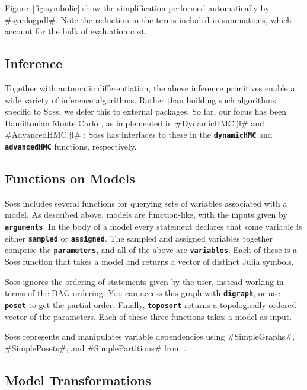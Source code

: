 \documentclass[anonymous=false, %
               format=acmsmall, %
               review=false, %
               screen=true, %
               nonacm=true]{acmart}
\begin{document}
Figure~\ref{fig:symbolic} show the simplification performed automatically by \jl#symlogpdf#. Note the reduction in the terms included in summations, which account for the bulk of evaluation cost. 

\subsection{Inference}

Together with automatic differentiation, the above inference primitives enable a wide variety of inference algorithms. Rather than building such algorithms specific to Soss, we defer this to external packages. So far, our focus has been Hamiltonian Monte Carlo \cite{Neal2011}, as implemented in \jl#DynamicHMC.jl# \cite{tamas_k_papp_2019_3590018} and \jl#AdvancedHMC.jl# \cite{ge2018t}; Soss has interfaces to these in the {\bf \texttt{dynamicHMC}} and {\bf \texttt{advancedHMC}} functions, respectively.

\subsection{Functions on Models}

Soss includes several functions for querying sets of variables associated with a model. As described above, models are function-like, with the inputs given by {\bf \texttt{arguments}}. In the body of a model every statement declares that some variable is either {\bf \texttt{sampled}} or {\bf \texttt{assigned}}. The sampled and assigned variables together comprise the {\bf \texttt{parameters}}, and all of the above are {\bf \texttt{variables}}. Each of these is a Soss function that takes a model and returns a vector of distinct Julia symbols.

Soss ignores the ordering of statements given by the user, instead working in terms of the DAG ordering. You can access this graph with {\bf \texttt{digraph}}, or use {\bf \texttt{poset}} to get the partial order. Finally, {\bf \texttt{toposort}} returns a topologically-ordered vector of the parameters. Each of these three functions takes a model as input.

Soss represents and manipulates variable dependencies using \jl#SimpleGraphs#, \jl#SimplePosets#, and \jl#SimplePartitions# from \cite{SimpleWorld}.
 

\subsection{Model Transformations}
\end{document}
